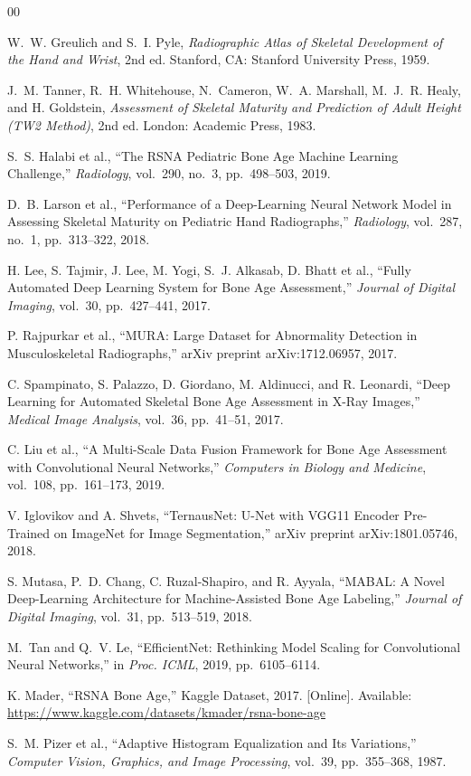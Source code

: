 \documentclass[conference]{IEEEtran}
\begin{document}
\begin{thebibliography}{00}

W.~W. Greulich and S.~I. Pyle,
\textit{Radiographic Atlas of Skeletal Development of the Hand and Wrist},
2nd ed. Stanford, CA: Stanford University Press, 1959.

J.~M. Tanner, R.~H. Whitehouse, N.~Cameron, W.~A. Marshall, M.~J.~R. Healy, and H. Goldstein,
\textit{Assessment of Skeletal Maturity and Prediction of Adult Height (TW2 Method)},
2nd ed. London: Academic Press, 1983.

S.~S. Halabi et al.,
``The RSNA Pediatric Bone Age Machine Learning Challenge,''
\textit{Radiology}, vol.~290, no.~3, pp.~498--503, 2019.

D.~B. Larson et al.,
``Performance of a Deep-Learning Neural Network Model in Assessing Skeletal Maturity on Pediatric Hand Radiographs,''
\textit{Radiology}, vol.~287, no.~1, pp.~313--322, 2018.

H. Lee, S. Tajmir, J. Lee, M. Yogi, S.~J. Alkasab, D. Bhatt et al.,
``Fully Automated Deep Learning System for Bone Age Assessment,''
\textit{Journal of Digital Imaging}, vol.~30, pp.~427--441, 2017.

P. Rajpurkar et al.,
``MURA: Large Dataset for Abnormality Detection in Musculoskeletal Radiographs,''
arXiv preprint arXiv:1712.06957, 2017.

C. Spampinato, S. Palazzo, D. Giordano, M. Aldinucci, and R. Leonardi,
``Deep Learning for Automated Skeletal Bone Age Assessment in X-Ray Images,''
\textit{Medical Image Analysis}, vol.~36, pp.~41--51, 2017.

C. Liu et al.,
``A Multi-Scale Data Fusion Framework for Bone Age Assessment with Convolutional Neural Networks,''
\textit{Computers in Biology and Medicine}, vol.~108, pp.~161--173, 2019.

V. Iglovikov and A. Shvets,
``TernausNet: U-Net with VGG11 Encoder Pre-Trained on ImageNet for Image Segmentation,''
arXiv preprint arXiv:1801.05746, 2018.

S. Mutasa, P.~D. Chang, C. Ruzal-Shapiro, and R. Ayyala,
``MABAL: A Novel Deep-Learning Architecture for Machine-Assisted Bone Age Labeling,''
\textit{Journal of Digital Imaging}, vol.~31, pp.~513--519, 2018.

M.~Tan and Q.~V. Le,
``EfficientNet: Rethinking Model Scaling for Convolutional Neural Networks,''
in \textit{Proc. ICML}, 2019, pp.~6105--6114.

K. Mader,
``RSNA Bone Age,''
Kaggle Dataset, 2017.
[Online]. Available: \url{https://www.kaggle.com/datasets/kmader/rsna-bone-age}

S.~M. Pizer et al.,
``Adaptive Histogram Equalization and Its Variations,''
\textit{Computer Vision, Graphics, and Image Processing}, vol.~39, pp.~355--368, 1987.

\end{thebibliography}
\end{document}
